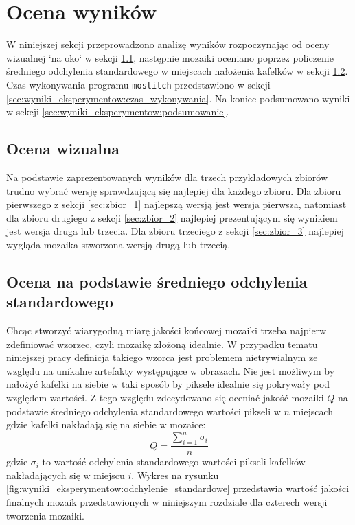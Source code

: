 \section{Ocena wyników}
\label{sec:ocena_wynikow}

W niniejszej sekcji przeprowadzono analizę wyników rozpoczynając od oceny wizualnej `na oko` w sekcji \ref{sec:wyniki_eksperymentow:ocena_wizualna}, następnie mozaiki oceniano poprzez policzenie średniego odchylenia standardowego w miejscach nałożenia kafelków w sekcji \ref{sec:wyniki_eksperymentow:ochylenie_standardowe}. Czas wykonywania programu \texttt{mostitch} przedstawiono w sekcji \ref{sec:wyniki_eksperymentow:czas_wykonywania}. Na koniec podsumowano wyniki w sekcji \ref{sec:wyniki_eksperymentow:podsumowanie}.

\subsection{Ocena wizualna}
\label{sec:wyniki_eksperymentow:ocena_wizualna}

Na podstawie zaprezentowanych wyników dla trzech przykładowych zbiorów trudno wybrać wersję sprawdzającą się najlepiej dla każdego zbioru. Dla zbioru pierwszego z sekcji \ref{sec:zbior_1} najlepszą wersją jest wersja pierwsza, natomiast dla zbioru drugiego z sekcji \ref{sec:zbior_2} najlepiej prezentującym się wynikiem jest wersja druga lub trzecia. Dla zbioru trzeciego z sekcji \ref{sec:zbior_3} najlepiej wygląda mozaika stworzona wersją drugą lub trzecią. 

\subsection{Ocena na podstawie średniego odchylenia standardowego}
\label{sec:wyniki_eksperymentow:ochylenie_standardowe}

Chcąc stworzyć wiarygodną miarę jakości końcowej mozaiki trzeba najpierw zdefiniować wzorzec, czyli mozaikę złożoną idealnie. W przypadku tematu niniejszej pracy definicja takiego wzorca jest problemem nietrywialnym ze względu na unikalne artefakty występujące w obrazach. Nie jest możliwym by nałożyć kafelki na siebie w taki sposób by piksele idealnie się pokrywały pod względem wartości. Z tego względu zdecydowano się oceniać jakość mozaiki $Q$ na podstawie średniego odchylenia standardowego wartości pikseli w $n$ miejscach gdzie kafelki nakładają się na siebie w mozaice:
\begin{equation}
Q = \frac{\sum_{i=1}^{n} \sigma_{i}}{n}
\label{eq:standard_deviation}
\end{equation}
gdzie $\sigma_{i}$ to wartość odchylenia standardowego wartości pikseli kafelków nakładających się w miejscu $i$. Wykres na rysunku \ref{fig:wyniki_eksperymentow:odchylenie_standardowe} przedstawia wartość jakości finalnych mozaik przedstawionych w niniejszym rozdziale dla czterech wersji tworzenia mozaiki.

